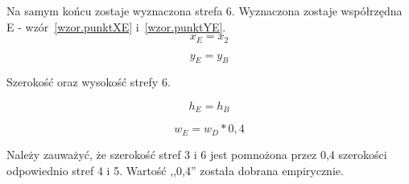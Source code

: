 \documentclass[a4paper,twoside,12pt]{book}
\begin{document}
    Na samym końcu zostaje wyznaczona strefa 6.
    Wyznaczona zostaje współrzędna E - wzór~\ref{wzor.punktXE} i~\ref{wzor.punktYE}.
    \large
    \begin{equation}
        x_{E}=x_{2}
        \label{wzor.punktXE}
    \end{equation}
    \normalsize

    \large
    \begin{equation}
        y_{E}= y_{B}
        \label{wzor.punktYE}
    \end{equation}

    Szerokość oraz wysokość strefy 6.

    \large
    \begin{equation}
        h_{E}=h_{B}
        \label{wzor.punktHE}
    \end{equation}
    \normalsize

    \large
    \begin{equation}
        w_{E}= w_{D} * 0,4
        \label{wzor.punktWE}
    \end{equation}
    \normalsize

    Należy zauważyć, że szerokość stref 3 i 6 jest pomnożona przez 0,4 szerokości odpowiednio
    stref 4 i 5.
    Wartość ,,0,4'' została dobrana empirycznie.
\end{document}
